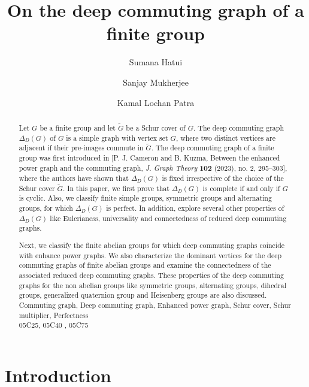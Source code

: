 \documentclass[12pt,a4paper]{article}
\begin{document}
\title{\bf On the deep commuting graph of a finite group}
\author{Sumana Hatui \and Sanjay Mukherjee \and Kamal Lochan Patra}
\date{}
\maketitle

\begin{abstract}
Let $G$ be a finite group and let $\tilde{G}$ be a Schur cover of $G$. The deep commuting graph $\Delta_D(G)$ of $G$ is a simple graph with vertex set $G$, where two distinct vertices are adjacent if their pre-images commute in $\tilde{G}$. The deep commuting graph of a finite group was first introduced in [P. J. Cameron and B. Kuzma, Between the enhanced power graph and the commuting graph, {\it J. Graph Theory} {\bf 102} (2023), no. 2, 295--303], where the authors have shown  that $\Delta_D(G)$ is fixed irrespective of the choice of the Schur cover $\tilde{G}$. In this paper,  we first prove that $\Delta_D(G)$ is complete if and only if $G$ is cyclic. Also, we classify finite simple groups, symmetric groups and alternating groups, for which $\Delta_D(G)$ is perfect. In addition, explore several other properties of $\Delta_D(G)$ like Eulerianess, universality and connectedness of reduced deep commuting graphs. 

Next, we classify the finite abelian groups for which deep commuting graphs coincide with  enhance power graphs. We  also characterize the dominant vertices for the  deep commuting graphs of finite abelian groups and  examine the connectedness of the associated reduced deep commuting graphs. These properties of the deep commuting graphs for the non abelian groups like symmetric groups, alternating groups, dihedral groups, generalized quaternion group and Heisenberg groups are also discussed.\\

 Commuting graph, Deep commuting graph, Enhanced power graph, Schur cover, Schur multiplier, Perfectness\\

 05C25, 05C40 , 05C75

\end{abstract}


\section{Introduction}
\end{document}
